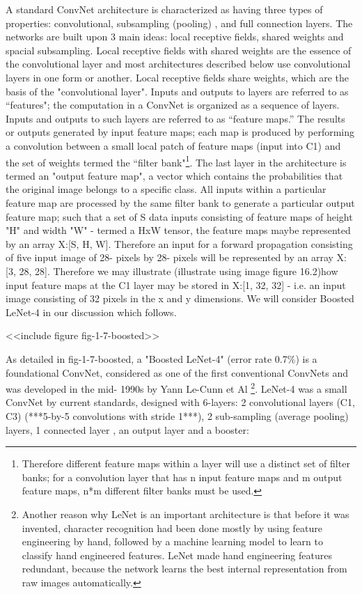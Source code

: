 \documentclass[7pt]{article}
\begin{document}
A standard ConvNet architecture is characterized as having three types of properties: convolutional, subsampling (pooling) , and full connection layers. The networks are built upon 3 main ideas: local receptive fields, shared weights and spacial subsampling. Local receptive fields with shared weights are the essence of the convolutional layer and most architectures described below use convolutional layers in one form or another. Local receptive fields share weights, which are the basis of the "convolutional layer". Inputs and outputs to layers are referred to as “features"; the computation in a ConvNet is organized as a sequence of layers. Inputs and outputs to such layers are referred to as “feature maps.” The results or outputs generated by input feature maps;  each map is produced by performing a convolution between a small local patch of feature maps (input into C1) and the set of weights termed the “filter bank"\footnote{Therefore different feature maps within a layer will use a distinct set of filter banks; for a convolution layer that has n input feature maps and m output feature maps, n*m different filter banks must be used.}. The last layer in the architecture is termed an "output feature map", a vector which contains the probabilities that the original image belongs to a specific class.  All inputs within a particular feature map are processed by the same filter bank to generate a particular output feature map; such that a set of S data inputs consisting of feature maps of height "H" and width "W" - termed a HxW tensor, the feature maps maybe represented by an array X:[S, H, W]. Therefore an input for a forward propagation consisting of five input image of 28- pixels by 28- pixels will be represented by an array X:[3, 28, 28].  Therefore we may illustrate (illustrate using image figure 16.2)how input feature maps at the C1 layer may be stored in X:[1, 32, 32]  - i.e. an input image consisting of 32 pixels in the x and y dimensions. We will consider Boosted LeNet-4 in our discussion which follows. 


<<include figure fig-1-7-boosted>>

As detailed in fig-1-7-boosted, a "Boosted LeNet-4" (error rate 0.7\%) is a foundational ConvNet, considered as one of the first conventional ConvNets and was developed in the mid- 1990s by Yann Le-Cunn et Al \footnote{Another reason why LeNet is an important architecture is that before it was invented, character recognition had been done mostly by using feature engineering by hand, followed by a machine learning model to learn to classify hand engineered features. LeNet made hand engineering features redundant, because the network learns the best internal representation from raw images automatically.}. LeNet-4 was a small ConvNet by current standards, designed with 6-layers:  2 convolutional layers (C1, C3) (***5-by-5 convolutions with stride 1***), 2 sub-sampling (average pooling) layers, 1 connected layer , an output layer and a booster:
\end{document}

